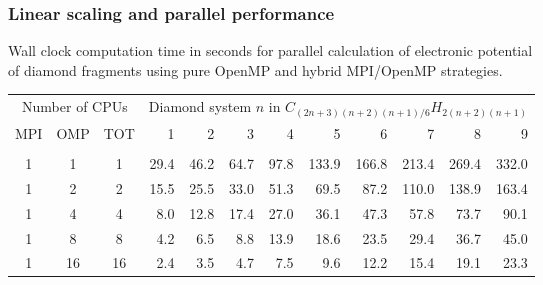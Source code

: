 \begin{frame}
    \frametitle{Linear scaling and parallel performance}
    \centering
    Wall clock computation time in seconds for parallel calculation of electronic potential\\
    of diamond fragments using pure OpenMP and hybrid MPI/OpenMP strategies.\\
    \begin{table}
    \tiny
    \begin{tabular}{cccrrrrrrrrr}
	\hline
	\hline                                                                           
	\multicolumn{3}{c}{Number of CPUs}&
	\multicolumn{9}{c}{Diamond system $n$ in $C_{(2n+3)(n+2)(n+1)/6}H_{2(n+2)(n+1)}$}\\
	MPI&OMP&TOT	&1	&2	&3	&4	&5	&6	&7	&8	&9	\\
	\hline
	   &   &   	&	&      	&	&	&	&	&	&	&	\\
	  1&  1&  1	& 29.4	& 46.2 	& 64.7 	& 97.8  &133.9  &166.8  &213.4  &269.4  &332.0  \\
	  1&  2&  2	& 15.5	& 25.5 	& 33.0 	& 51.3  & 69.5  & 87.2  &110.0  &138.9  &163.4  \\
	  1&  4&  4	&  8.0 	& 12.8 	& 17.4 	& 27.0  & 36.1  & 47.3  & 57.8  & 73.7  & 90.1  \\
	  1&  8&  8	&  4.2 	&  6.5 	&  8.8 	& 13.9  & 18.6  & 23.5  & 29.4  & 36.7  & 45.0  \\
	  1& 16& 16	&  2.4 	&  3.5 	&  4.7 	&  7.5  &  9.6  & 12.2  & 15.4  & 19.1  & 23.3  \\

\end{tabular}
\end{table}
\end{frame}

